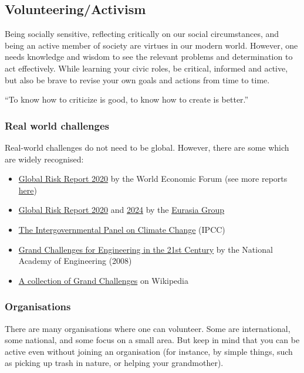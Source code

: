 \documentclass{article}
\begin{document}
\subsection{Volunteering/Activism}

Being socially sensitive, reflecting critically on our social circumstances, and being an active member of society are virtues in our modern world.
However, one needs knowledge and wisdom to see the relevant problems and determination to act effectively.
While learning your civic roles,
be critical, informed and active, but also be brave to revise your own goals and actions from time to time.

\vspace{1cm}
{``To know how to criticize is good, to know how to create is better.''
\\[5pt]
}

\subsubsection{Real world challenges}
Real-world challenges do not need to be global. However, there are some which are widely recognised:
\begin{itemize}
    \item \href{https://web.archive.org/web/20231103160332/https://www.weforum.org/publications/the-global-risks-report-2020}{Global Risk Report 2020} by the World Economic Forum (see more reports \href{https://www.weforum.org/publications/}{here})
    \item \href{https://www.eurasiagroup.net/issues/top-risks-2020}{Global Risk Report 2020} and \href{https://www.eurasiagroup.net/issues/top-risks-2024}{2024} by the \href{https://en.wikipedia.org/wiki/Eurasia_Group}{Eurasia Group}
    \item \href{https://www.ipcc.ch/}{The Intergovernmental Panel on Climate Change} (IPCC)
    \item \href{http://www.engineeringchallenges.org/challenges.aspx}{Grand Challenges for Engineering in the 21st Century} by the National Academy of Engineering (2008)
    \item \href{https://en.wikipedia.org/wiki/Grand_Challenges}{A collection of Grand Challenges} on Wikipedia
\end{itemize}

\subsubsection{Organisations}
There are many organisations where one can volunteer. Some are international, some national, and some focus on a small area.
But keep in mind that you can be active even without joining an organisation (for instance, by simple things, such as picking up trash in nature, or helping your grandmother).
\end{document}
